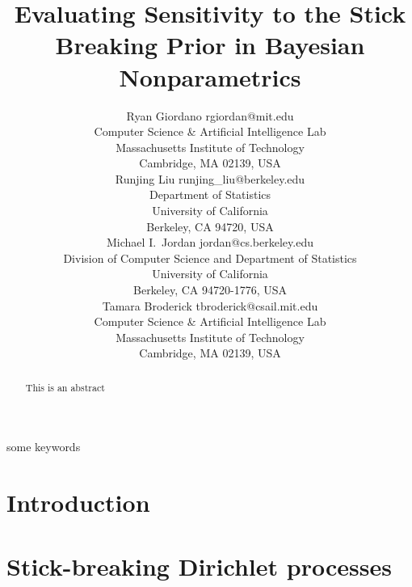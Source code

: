 \documentclass[twoside,11pt]{article}
\begin{document}
\title{Evaluating Sensitivity to the Stick Breaking Prior in Bayesian Nonparametrics}

\author{\name Ryan Giordano \email rgiordan@mit.edu \\
        \addr Computer Science \& Artificial Intelligence Lab\\
        Massachusetts Institute of Technology \\
        Cambridge, MA 02139, USA \\
        \AND
        \name Runjing Liu \email runjing\_liu@berkeley.edu \\
        \addr Department of Statistics\\
        University of California\\
        Berkeley, CA 94720, USA \\
        \AND
        \name Michael I.\ Jordan \email jordan@cs.berkeley.edu \\
        \addr Division of Computer Science and Department of Statistics\\
        University of California\\
        Berkeley, CA 94720-1776, USA \\
        \AND
        \name Tamara Broderick \email tbroderick@csail.mit.edu \\
        \addr Computer Science \& Artificial Intelligence Lab\\
        Massachusetts Institute of Technology \\
        Cambridge, MA 02139, USA}


\maketitle

\begin{abstract}%
This is an abstract
\end{abstract}

\begin{keywords}
  some keywords
\end{keywords}

\section{Introduction}\label{sec:introduction}



\section{Stick-breaking Dirichlet processes}
\end{document}
